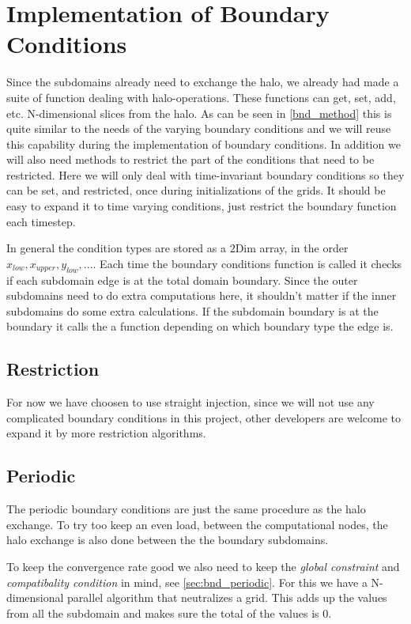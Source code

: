 \section{Implementation of Boundary Conditions}
    Since the subdomains already need to exchange the halo, we already had
    made a suite of function dealing with halo-operations. These functions
    can get, set, add, etc. N-dimensional slices from the halo. As can be seen in \cref{bnd_method}
    this is quite similar to the needs of the varying boundary conditions and we
    will reuse this capability during the implementation of boundary conditions.
    In addition we will also need methods to restrict the part of the conditions
    that need to be restricted. Here we will only deal with time-invariant boundary conditions
    so they can be set, and restricted, once during initializations of the grids.
    It should be easy to expand it to time varying conditions, just restrict the
    boundary function each timestep.

    In general the condition types are stored as a \(2\text{Dim}\) array, in the order
    \(x_{low}, x_{upper}, y_{low}, ...\). Each time the boundary conditions function
    is called it checks if each subdomain edge is at the total domain boundary.
    Since the outer subdomains need to do extra computations here, it shouldn't
    matter if the inner subdomains do some extra calculations. If the subdomain boundary
    is at the boundary it calls the a function depending on which boundary type
    the edge is.

    \subsection{Restriction}
        For now we have choosen to use straight injection, since we will not use any
        complicated boundary conditions in this project, other developers are welcome
        to expand it by more restriction algorithms.

    \subsection{Periodic}
        The periodic boundary conditions are just the same procedure as the halo
        exchange. To try too keep an even load, between the computational nodes,
        the halo exchange is also done between the the boundary subdomains.

        To keep the convergence rate good we also need to keep the \textit{global constraint}
        and \textit{compatibality condition} in mind, see \cref{sec:bnd_periodic}.
        For this we have a N-dimensional parallel algorithm that neutralizes a grid.
        This adds up the values from all the subdomain and makes sure the total of the values is \(0\).

